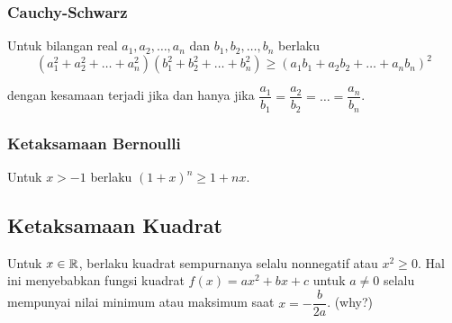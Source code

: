 \subsubsection{Cauchy-Schwarz}
Untuk bilangan real $a_1,a_2,\dots,a_n$ dan $b_1,b_2,\dots,b_n$ berlaku
$$(a_1^2+a_2^2+\dots+a_n^2)(b_1^2+b_2^2+\dots+b_n^2) \ge (a_1b_1+a_2b_2+\dots+a_nb_n)^2$$

dengan kesamaan terjadi jika dan hanya jika $\dfrac{a_1}{b_1}=\dfrac{a_2}{b_2}=\dots =\dfrac{a_n}{b_n}$.

\subsubsection{Ketaksamaan Bernoulli}
Untuk $x > -1$ berlaku $(1+x)^n \ge 1+nx$.

\subsection{Ketaksamaan Kuadrat}
Untuk $x \in \mathbb R$, berlaku kuadrat sempurnanya selalu nonnegatif atau $x^2 \ge 0$. Hal ini menyebabkan fungsi kuadrat $f(x)=ax^2+bx+c$ untuk $a \neq 0$ selalu mempunyai nilai minimum atau maksimum saat $x = -\dfrac{b}{2a}$. (why?)